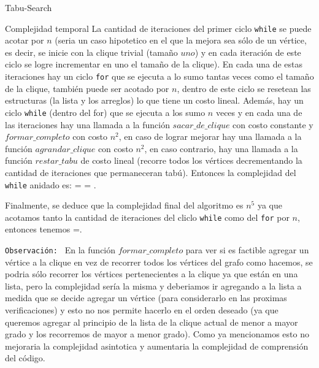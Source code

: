 \begin{section}{Tabu-Search}
\begin{subsection}{Complejidad temporal}
			 La cantidad de iteraciones del primer ciclo \texttt{while} se puede acotar por $n$ (seria un caso hipotetico en el que la mejora sea sólo de un vértice, es decir, se inicie con la clique trivial (tamaño $uno$) y en cada iteración de este ciclo se logre incrementar en uno el tamaño de la clique). En cada una de estas iteraciones hay un ciclo \texttt{for} que se ejecuta a lo sumo tantas veces como el tamaño de la clique, también puede ser acotado por $n$, dentro de este ciclo se resetean las estructuras (la lista y los arreglos) lo que tiene un costo lineal. Además, hay un ciclo \texttt{while} (dentro del for) que se ejecuta a los sumo $n$ veces y en cada una de las iteraciones hay una llamada a la función $sacar\_de\_clique$ con costo constante y $formar\_completo$ con costo $n^2$, en caso de lograr mejorar hay una llamada a la función $agrandar\_clique$ con costo $n^2$, en caso contrario, hay una llamada a la función $restar\_tabu$ de costo lineal (recorre todos los vértices decrementando la cantidad de iteraciones que permaneceran tabú). Entonces la complejidad del \texttt{while} anidado es:   =  = .

			 Finalmente, se deduce que la complejidad final del algoritmo es $n^5$ ya que acotamos tanto la cantidad de iteraciones del cliclo \texttt{while} como del \texttt{for} por $n$, entonces tenemos =.\Pa
			 
			 \texttt{Observación: } En la función $formar\_completo$ para ver si es factible agregar un vértice a la clique en vez de recorrer todos los vértices del grafo como hacemos, se podria sólo recorrer los vértices pertenecientes a la clique ya que están en una lista, pero la complejidad sería la misma y deberiamos ir agregando a la lista a medida que se decide agregar un vértice (para considerarlo en las proximas verificaciones) y esto no nos permite hacerlo en el orden deseado (ya que queremos agregar al principio de la lista de la clique actual de menor a mayor grado y los recorremos de mayor a menor grado). Como ya mencionamos esto no mejoraria la complejidad asintotica y aumentaria la complejidad de comprensión del código.
	\end{subsection}

\end{section}
